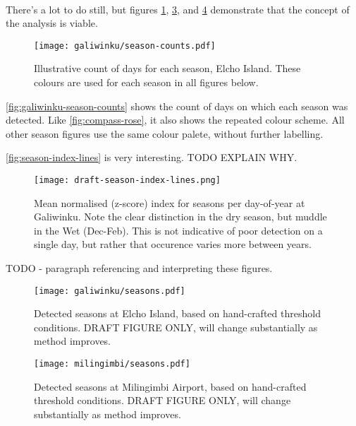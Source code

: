 ~\\

There's a lot to do still, but figures \ref{fig:galiwinku-season-counts},
\ref{fig:galiwinku-seasons}, and \ref{fig:milingimbi-seasons}
demonstrate that the concept of the analysis is viable.

\begin{figure}[h]
    \centering
    \texttt{[image: galiwinku/season-counts.pdf]}
    \caption[Calculated season frequency, Elcho Island]{
        Illustrative count of days for each season, Elcho Island.
        These colours are used for each season in all figures below.
        }
    \label{fig:galiwinku-season-counts}
\end{figure}

\autoref{fig:galiwinku-season-counts} shows the count of days on which
each season was detected.  Like \autoref{fig:compass-rose}, it also
shows the repeated colour scheme.  All other season figures use the
same colour palete, without further labelling.

\autoref{fig:season-index-lines} is very interesting.  TODO EXPLAIN WHY.

\begin{figure}[h]
    \centering
    \texttt{[image: draft-season-index-lines.png]}
    \caption[Season index by day-of-year, Elcho Island]{
        Mean normalised (z-score) index for seasons per day-of-year
        at Galiwinku.  Note the clear distinction in the dry season,
        but muddle in the Wet (Dec-Feb).
        This is not indicative of poor detection on a single day,
        but rather that occurence varies more between years.
        }
    \label{fig:season-index-lines}
\end{figure}




TODO - paragraph referencing and interpreting these figures.

\begin{figure}[p]
    \centering
    \texttt{[image: galiwinku/seasons.pdf]}
    \caption[Detected seasons for Elcho Island]{
        Detected seasons at Elcho Island, based on hand-crafted threshold conditions.
        DRAFT FIGURE ONLY, will change substantially as method improves.
        }
    \label{fig:galiwinku-seasons}
\end{figure}
\begin{figure}[p]
    \centering
    \texttt{[image: milingimbi/seasons.pdf]}
    \caption[Detected seasons for Milingimbi Airport]{
        Detected seasons at Milingimbi Airport, based on hand-crafted threshold conditions.
        DRAFT FIGURE ONLY, will change substantially as method improves.
        }
    \label{fig:milingimbi-seasons}
\end{figure}



